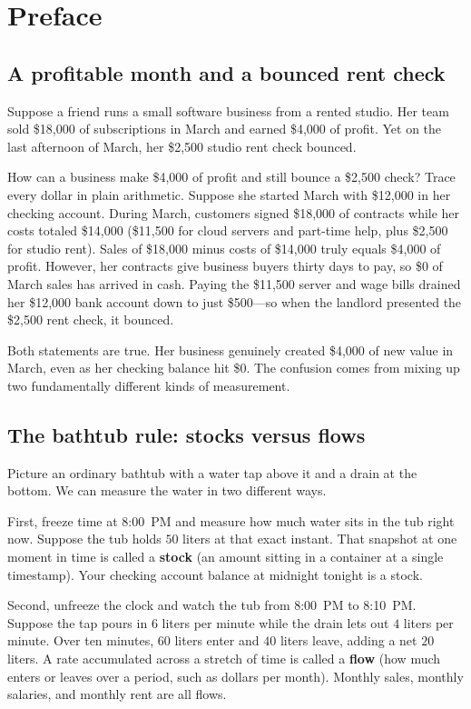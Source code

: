 \chapter*{Preface}

\section*{A profitable month and a bounced rent check}

Suppose a friend runs a small software business from a rented studio. Her team sold \$18,000 of subscriptions in March and earned \$4,000 of profit. Yet on the last afternoon of March, her \$2,500 studio rent check bounced.

How can a business make \$4,000 of profit and still bounce a \$2,500 check? Trace every dollar in plain arithmetic. Suppose she started March with \$12,000 in her checking account. During March, customers signed \$18,000 of contracts while her costs totaled \$14,000 (\$11,500 for cloud servers and part-time help, plus \$2,500 for studio rent). Sales of \$18,000 minus costs of \$14,000 truly equals \$4,000 of profit. However, her contracts give business buyers thirty days to pay, so \$0 of March sales has arrived in cash. Paying the \$11,500 server and wage bills drained her \$12,000 bank account down to just \$500---so when the landlord presented the \$2,500 rent check, it bounced.

Both statements are true. Her business genuinely created \$4,000 of new value in March, even as her checking balance hit \$0. The confusion comes from mixing up two fundamentally different kinds of measurement.

\section*{The bathtub rule: stocks versus flows}

Picture an ordinary bathtub with a water tap above it and a drain at the bottom. We can measure the water in two different ways.

First, freeze time at 8:00~PM and measure how much water sits in the tub right now. Suppose the tub holds $50$ liters at that exact instant. That snapshot at one moment in time is called a \textbf{stock} (an amount sitting in a container at a single timestamp). Your checking account balance at midnight tonight is a stock.

Second, unfreeze the clock and watch the tub from 8:00~PM to 8:10~PM. Suppose the tap pours in $6$ liters per minute while the drain lets out $4$ liters per minute. Over ten minutes, $60$ liters enter and $40$ liters leave, adding a net $20$ liters. A rate accumulated across a stretch of time is called a \textbf{flow} (how much enters or leaves over a period, such as dollars per month). Monthly sales, monthly salaries, and monthly rent are all flows.


